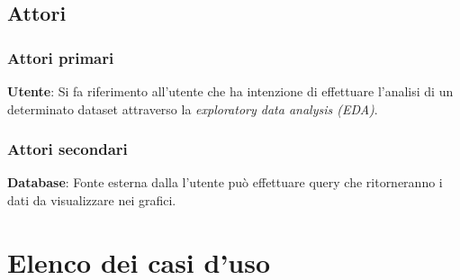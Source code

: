 \documentclass[../analisi-dei-requisiti.tex]{subfiles}
\begin{document}
%
\subsection{Attori}%
\label{subs:attori}

\subsubsection{Attori primari}%
\label{sssec:attori_primari}
\begin{description}
 \item \textbf{Utente}: Si fa riferimento all'utente che ha intenzione di effettuare l'analisi di un determinato dataset attraverso la \emph{exploratory data analysis (EDA)}.
\end{description}

\subsubsection{Attori secondari}
\label{sssec:attori_secondari}
\begin{description}
    \item \textbf{Database}: Fonte esterna dalla l'utente può effettuare query che ritorneranno i dati da visualizzare nei grafici.
\end{description}

\newpage
\section{Elenco dei casi d'uso}
\label{subs:elenco_dei_casi_duso}


\newpage

\newpage

\newpage

\newpage


\end{document}

